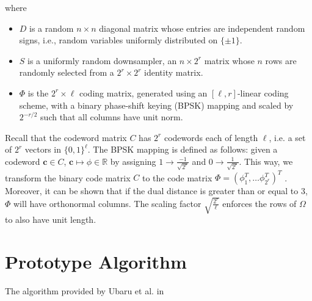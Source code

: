 \documentclass[12pt]{article}
\newcommand{\tbf}{\textbf}
\newcommand{\mB}{\mathbb}
\begin{document}
where 
\begin{itemize}
\item $D$ is a random $n \times n$ diagonal matrix whose entries are independent random signs, i.e., random variables uniformly distributed on $\{ \pm 1 \}$.

\item $S$ is a uniformly random downsampler, an $n \times 2^r$ matrix whose $n$ rows are randomly selected from a $2^r \times 2^r$ identity matrix.

\item $\Phi$ is the $2^r \times \ell$ coding matrix, generated using an $[ \ell, r]$-linear coding scheme, with a binary phase-shift keying (BPSK) mapping and scaled by $2^{-r/2}$ such that all columns have unit norm.

\end{itemize}
Recall that the codeword matrix $C$ has $2^r$ codewords each of length $\ell$, i.e. a set of $2^r$ vectors in $\{0,1\}^{\ell}$. The BPSK mapping is defined as follows: given a codeword $\tbf{c} \in C$, $\tbf{c} \mapsto \phi \in \mB{R}$ by assigning $1 \rightarrow \frac{-1}{\sqrt{2^r}}$ and $0 \rightarrow \frac{1}{\sqrt{2^r}}$. This way, we transform the binary code matrix $C$ to the code matrix $\Phi = (\phi_1^T,  \hdots \phi_{2^r}^T) ^T$ \cite{ubaru2015low}. Moreover, it can be shown that if the dual distance is greater than or equal to 3, $\Phi$ will have orthonormal columns. The scaling factor $\sqrt{\frac{2^r}{\ell}}$ enforces the rows of $\Omega$ to also have unit length.

\section{Prototype Algorithm}
The algorithm provided by Ubaru et al. in \cite{ubaru2015low} 



 
 
 
\end{document}
